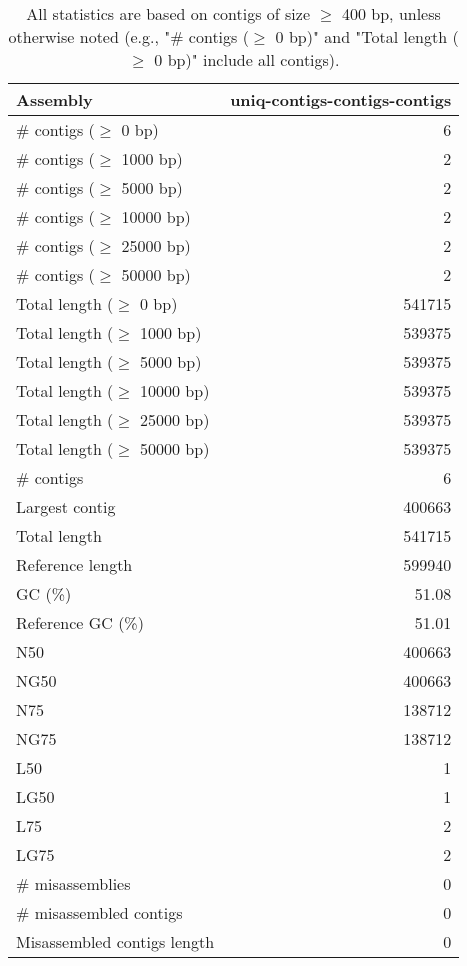 \documentclass[12pt,a4paper]{article}
\begin{document}
\begin{table}[ht]
\begin{center}
\caption{All statistics are based on contigs of size $\geq$ 400 bp, unless otherwise noted (e.g., "\# contigs ($\geq$ 0 bp)" and "Total length ($\geq$ 0 bp)" include all contigs).}
\begin{tabular}{|l*{1}{|r}|}
\hline
Assembly & uniq-contigs-contigs-contigs \\ \hline
\# contigs ($\geq$ 0 bp) & 6 \\ \hline
\# contigs ($\geq$ 1000 bp) & 2 \\ \hline
\# contigs ($\geq$ 5000 bp) & 2 \\ \hline
\# contigs ($\geq$ 10000 bp) & 2 \\ \hline
\# contigs ($\geq$ 25000 bp) & 2 \\ \hline
\# contigs ($\geq$ 50000 bp) & 2 \\ \hline
Total length ($\geq$ 0 bp) & 541715 \\ \hline
Total length ($\geq$ 1000 bp) & 539375 \\ \hline
Total length ($\geq$ 5000 bp) & 539375 \\ \hline
Total length ($\geq$ 10000 bp) & 539375 \\ \hline
Total length ($\geq$ 25000 bp) & 539375 \\ \hline
Total length ($\geq$ 50000 bp) & 539375 \\ \hline
\# contigs & 6 \\ \hline
Largest contig & 400663 \\ \hline
Total length & 541715 \\ \hline
Reference length & 599940 \\ \hline
GC (\%) & 51.08 \\ \hline
Reference GC (\%) & 51.01 \\ \hline
N50 & 400663 \\ \hline
NG50 & 400663 \\ \hline
N75 & 138712 \\ \hline
NG75 & 138712 \\ \hline
L50 & 1 \\ \hline
LG50 & 1 \\ \hline
L75 & 2 \\ \hline
LG75 & 2 \\ \hline
\# misassemblies & 0 \\ \hline
\# misassembled contigs & 0 \\ \hline
Misassembled contigs length & 0 \\ \hline

\end{tabular}
\end{center}
\end{table}
\end{document}
